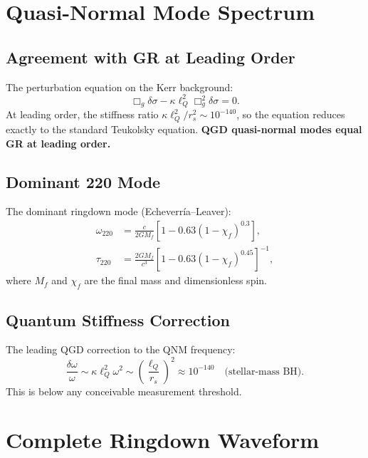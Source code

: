 \documentclass[12pt,a4paper]{article}
\newcommand{\lQ}{\ell_Q}
\begin{document}
\section{Quasi-Normal Mode Spectrum}

\subsection{Agreement with GR at Leading Order}

The perturbation equation on the Kerr background:
\begin{equation}
  \boxed{\Box_g\delta\sigma - \kappa\lQ^2\Box_g^2\delta\sigma = 0.}
\end{equation}
At leading order, the stiffness ratio $\kappa\lQ^2/r_s^2 \sim 10^{-140}$, so the
equation reduces exactly to the standard Teukolsky equation.
\textbf{QGD quasi-normal modes equal GR at leading order.}

\subsection{Dominant 220 Mode}

The dominant ringdown mode (Echeverr\'ia--Leaver):
\begin{align}
  \omega_{220} &= \frac{c}{2GM_f}\left[1 - 0.63(1-\chi_f)^{0.3}\right], \\
  \tau_{220} &= \frac{2GM_f}{c^3}\left[1 - 0.63(1-\chi_f)^{0.45}\right]^{-1},
\end{align}
where $M_f$ and $\chi_f$ are the final mass and dimensionless spin.

\subsection{Quantum Stiffness Correction}

The leading QGD correction to the QNM frequency:
\begin{equation}
  \frac{\delta\omega}{\omega} \sim \kappa\lQ^2\omega^2 \sim \left(\frac{\lQ}{r_s}\right)^2
  \approx 10^{-140} \quad \text{(stellar-mass BH).}
\end{equation}
This is below any conceivable measurement threshold.

\section{Complete Ringdown Waveform}
\end{document}

